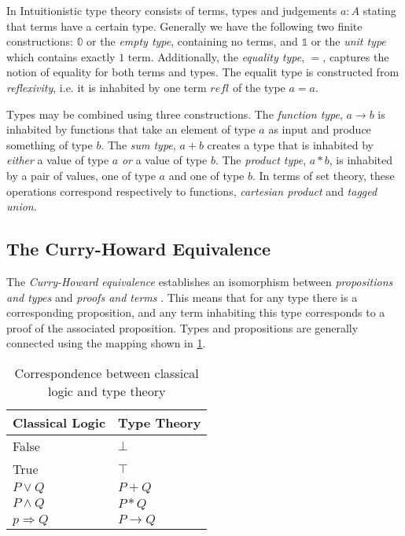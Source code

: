 \documentclass[a4paper,msc,twosized=semi]{uustthesis}
\begin{document}
  In Intuitionistic type theory consists of terms, types and judgements $a : A$ 
  stating that terms have a certain type. Generally we have the following two finite 
  constructions: $\mathbb{0}$ or the \emph{empty type}, containing no terms, and 
  $\mathbb{1}$ or the \emph{unit type} which contains exactly $1$ term. Additionally,
  the \emph{equality type}, $=$, captures the notion of equality for both terms and 
  types. The equalit type is constructed from \emph{reflexivity}, i.e. it is 
  inhabited by one term $refl$ of the type $a = a$. 

  Types may be combined using three constructions. The \emph{function type}, $a 
  \rightarrow b$ is inhabited by functions that take an element of type $a$ as input 
  and produce something of type $b$. The \emph{sum type}, $a + b$ creates a type that 
  is inhabited by \emph{either} a value of type $a$ \emph{or} a 
  value of type $b$. The \emph{product type}, $a * b$, is inhabited by a pair of 
  values, one of type $a$ and one of type $b$. In terms of set theory, these 
  operations correspond respectively to functions, \emph{cartesian product} and \emph
  {tagged union}. 

  \subsection{The Curry-Howard Equivalence}

  The \emph{Curry-Howard equivalence} establishes an isomorphism between \emph
  {propositions and types} and \emph{proofs and terms} \cite{wadler2015propositions}. 
  This means that for any type there is a corresponding proposition, and any term 
  inhabiting this type corresponds to a proof of the associated proposition. Types and 
  propositions are generally connected using the mapping shown in \cref{tbl:chiso}.

\begin{table}[h]\label{tbl:chiso}
\begin{center}\begin{framed}
\begin{tabular}{ll}
\multicolumn{1}{c}{\textbf{Classical Logic}} & \textbf{Type Theory} \\ \hline \hline
False                                        & $\bot$               \\
True                                         & $\top$               \\
$P \vee Q$                                   & $P + Q$              \\
$P \wedge Q$                                 & $P * Q$              \\
$p \Rightarrow Q$                            & $P \rightarrow Q$                       
\end{tabular}
\caption{Correspondence between classical logic and type theory}
\end{framed}\end{center}
\end{table}
\end{document}
